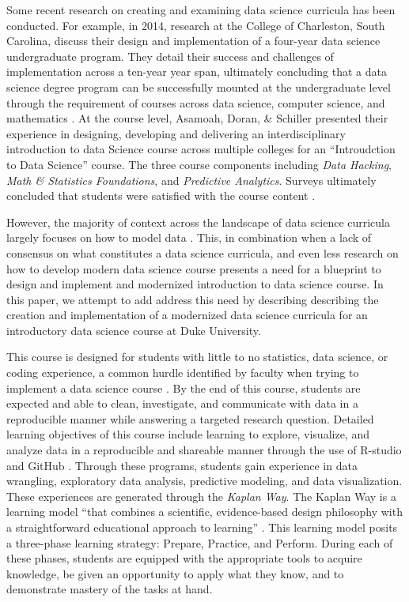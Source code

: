 \documentclass[
  12pt]{article}
\begin{document}
Some recent research on creating and examining data science curricula
has been conducted. For example, in 2014, research at the College of
Charleston, South Carolina, discuss their design and implementation of a
four-year data science undergraduate program. They detail their success
and challenges of implementation across a ten-year year span, ultimately
concluding that a data science degree program can be successfully
mounted at the undergraduate level through the requirement of courses
across data science, computer science, and mathematics
\citep{Anderson2014}. At the course level, Asamoah, Doran, \& Schiller
presented their experience in designing, developing and delivering an
interdisciplinary introduction to data Science course across multiple
colleges for an ``Introudction to Data Science'' course. The three
course components including \emph{Data Hacking}, \emph{Math \&
Statistics Foundations}, and \emph{Predictive Analytics}. Surveys
ultimately concluded that students were satisfied with the course
content \citep{Asamoah2015}.

However, the majority of context across the landscape of data science
curricula largely focuses on how to model data \citep{Donoho2017}. This,
in combination when a lack of consensus on what constitutes a data
science curricula, and even less research on how to develop modern data
science course presents a need for a blueprint to design and implement
and modernized introduction to data science course. In this paper, we
attempt to add address this need by describing describing the creation
and implementation of a modernized data science curricula for an
introductory data science course at Duke University.

This course is designed for students with little to no statistics, data
science, or coding experience, a common hurdle identified by faculty
when trying to implement a data science course \citep{Schwab2020}. By
the end of this course, students are expected and able to clean,
investigate, and communicate with data in a reproducible manner while
answering a targeted research question. Detailed learning objectives of
this course include learning to explore, visualize, and analyze data in
a reproducible and shareable manner through the use of R-studio and
GitHub \citep{R21, github}. Through these programs, students gain
experience in data wrangling, exploratory data analysis, predictive
modeling, and data visualization. These experiences are generated
through the \emph{Kaplan Way}. The Kaplan Way is a learning model ``that
combines a scientific, evidence-based design philosophy with a
straightforward educational approach to learning''
\citep{schweser_2023}. This learning model posits a three-phase learning
strategy: Prepare, Practice, and Perform. During each of these phases,
students are equipped with the appropriate tools to acquire knowledge,
be given an opportunity to apply what they know, and to demonstrate
mastery of the tasks at hand.
\end{document}

